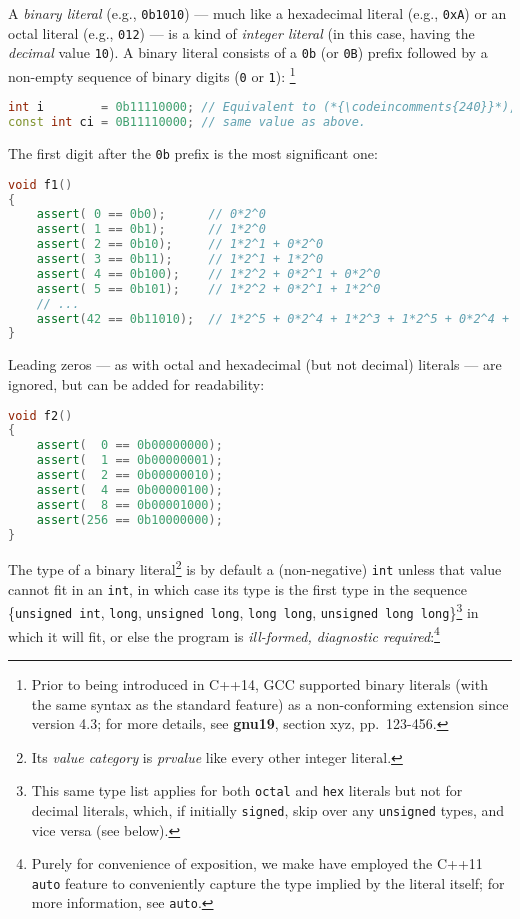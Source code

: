 \documentclass[twoside,10pt,letterpaper,usenames]{newstyle-PearsonGeneric-7-38}
\newcommand{\codeincomments}{\color{skyblue}\ttfamily}
\begin{document}
A \emph{binary literal} (e.g., \texttt{0b1010}) --- much like a
hexadecimal literal (e.g., \texttt{0xA}) or an octal literal (e.g.,
\texttt{012}) --- is a kind of \emph{integer literal} (in this case,
having the \emph{decimal} value \texttt{10}). A binary literal consists
of a \texttt{0b} (or \texttt{0B}) prefix followed by a non-empty
sequence of binary digits (\texttt{0} or \texttt{1}):
{\cprotect\footnote{Prior to being introduced in C++14, GCC supported
binary literals (with the same syntax as the standard feature) as a
non-conforming extension since version 4.3; for more details, see
\textbf{{gnu19}}, section xyz, pp.~123-456.}}

\begin{lstlisting}[language=C++]
int i        = 0b11110000; // Equivalent to (*{\codeincomments{240}}*), (*{\codeincomments{0360}}*), or (*{\codeincomments{0xF0}}*)
const int ci = 0B11110000; // same value as above.
\end{lstlisting}
    

The first digit after the \texttt{0b} prefix is the most significant
one:

\begin{lstlisting}[language=C++]
void f1()
{
    assert( 0 == 0b0);      // 0*2^0
    assert( 1 == 0b1);      // 1*2^0
    assert( 2 == 0b10);     // 1*2^1 + 0*2^0
    assert( 3 == 0b11);     // 1*2^1 + 1*2^0
    assert( 4 == 0b100);    // 1*2^2 + 0*2^1 + 0*2^0
    assert( 5 == 0b101);    // 1*2^2 + 0*2^1 + 1*2^0
    // ...
    assert(42 == 0b11010);  // 1*2^5 + 0*2^4 + 1*2^3 + 1*2^5 + 0*2^4 + 1*2^3
}
\end{lstlisting}
    

Leading zeros --- as with octal and hexadecimal (but not decimal)
literals --- are ignored, but can be added for readability:

\begin{lstlisting}[language=C++]
void f2()
{
    assert(  0 == 0b00000000);
    assert(  1 == 0b00000001);
    assert(  2 == 0b00000010);
    assert(  4 == 0b00000100);
    assert(  8 == 0b00001000);
    assert(256 == 0b10000000);
}
\end{lstlisting}
    

The type of a binary literal{\cprotect\footnote{Its \emph{value
category} is \emph{prvalue} like every other integer literal.}} is by
default a (non-negative) \texttt{int} unless that value cannot fit in an
\texttt{int}, in which case its type is the first type in the sequence
\{\texttt{unsigned}~\texttt{int}, \texttt{long},
\texttt{unsigned}~\texttt{long}, \texttt{long}~\texttt{long},
\texttt{unsigned}~\texttt{long}~\texttt{long}\}{\cprotect\footnote{This
same type list applies for both \texttt{octal} and \texttt{hex}
literals but not for decimal literals, which, if initially
\texttt{signed}, skip over any \texttt{unsigned} types, and vice versa
(see below).}} in which it will fit, or else the program is
\emph{ill-formed, diagnostic required}:{\cprotect\footnote{Purely for
convenience of exposition, we make have employed the C++11
\texttt{auto} feature to conveniently capture the type implied by the
literal itself; for more information, see \texttt{auto}.}}
\end{document}
